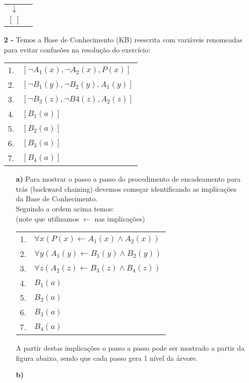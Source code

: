\documentclass[12pt]{article}
\begin{document}
\begin{itemize}
\begin{center}
\begin{tabular}{c c}
					$\downarrow$ & \\
					$[ \ ]$ & \\
				\end{tabular}
			\end{center}
		\item[\textbf{2 -}]
			\hfill\newline
			Temos a Base de Conhecimento (KB) reescrita com variáveis renomeadas para evitar confusões
			na resolução do exercício:
			\begin{center}
				\begin{tabular}{c l}
				1. & $[\neg A_1(x), \neg A_2(x), P(x)]$\\
				2. & $[\neg B_1(y), \neg B_2(y), A_1(y)]$\\
				3. & $[\neg B_3(z), \neg B4(z), A_2(z)]$\\
				4. & $[B_1(a)]$\\
				5. & $[B_2(a)]$\\
				6. & $[B_3(a)]$\\
				7. & $[B_4(a)]$\\
				\end{tabular}
			\end{center}
			\begin{itemize}	
				\item[\textbf{a) }]					
					\hfill\newline
					Para mostrar o passo a passo do procedimento de encadeamento para
					trás (backward chaining) devemos começar identificando as implicações
					da Base de Conhecimento.\\
					Seguindo a ordem acima temos:\\ 
					(note que utilizamos $\leftarrow$ nas implicações)\\
					\begin{center}
						\begin{tabular}{c l}
							1. & $\forall x (P(x) \leftarrow A_1(x) \land A_2(x))$\\
							2. & $\forall y (A_1(y) \leftarrow B_1(y) \land B_2(y))$\\
							3. & $\forall z (A_2(z) \leftarrow B_3(z) \land B_4(z))$\\
							4. & $B_1(a)$\\
							5. & $B_2(a)$\\
							6. & $B_3(a)$\\
							7. & $B_4(a)$\\
						\end{tabular}
					\end{center}
					A partir destas implicações o passo a passo pode ser mostrado a partir da figura
					abaixo, sendo que cada passo gera 1 nível da árvore.
				\item[\textbf{b) }]
			\end{itemize}	
	\end{itemize}
\end{document}
